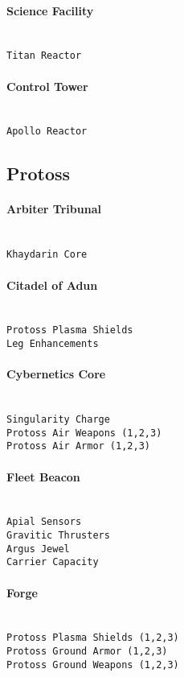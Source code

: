 \paragraph{Science Facility} \mbox{}\\
\verb|Titan Reactor|

\paragraph{Control Tower} \mbox{}\\
\verb|Apollo Reactor|

\subsection{Protoss}

\paragraph{Arbiter Tribunal} \mbox{}\\
\verb|Khaydarin Core|

\paragraph{Citadel of Adun} \mbox{}\\
\verb|Protoss Plasma Shields|\\
\verb|Leg Enhancements|

\paragraph{Cybernetics Core} \mbox{}\\
\verb|Singularity Charge|\\
\verb|Protoss Air Weapons (1,2,3)|\\
\verb|Protoss Air Armor (1,2,3)|

\paragraph{Fleet Beacon} \mbox{}\\
\verb|Apial Sensors|\\
\verb|Gravitic Thrusters| \\
\verb|Argus Jewel|\\
\verb|Carrier Capacity|

\paragraph{Forge} \mbox{}\\
\verb|Protoss Plasma Shields (1,2,3)|\\
\verb|Protoss Ground Armor (1,2,3)|\\
\verb|Protoss Ground Weapons (1,2,3)|

